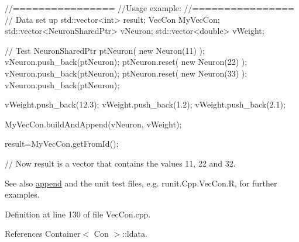 \begin{DoxyCode}
        //================
        //Usage example:
        //================
        // Data set up
                std::vector<int> result;
                VecCon MyVecCon;
                std::vector<NeuronSharedPtr> vNeuron;
                std::vector<double> vWeight;


        // Test
                NeuronSharedPtr ptNeuron( new Neuron(11) );
                vNeuron.push_back(ptNeuron);
                ptNeuron.reset( new Neuron(22) );
                vNeuron.push_back(ptNeuron);
                ptNeuron.reset( new Neuron(33) );
                vNeuron.push_back(ptNeuron);

                vWeight.push_back(12.3);
                vWeight.push_back(1.2);
                vWeight.push_back(2.1);

                MyVecCon.buildAndAppend(vNeuron, vWeight);

                result=MyVecCon.getFromId();

        // Now result is a vector that contains the values 11, 22 and 32.
\end{DoxyCode}


\begin{DoxySeeAlso}{See also}
\hyperlink{classvec_a_m_o_r_e_ab060ffa67e85997fc4236bedfd2f17b6}{append} and the unit test files, e.g. runit.Cpp.VecCon.R, for further examples. 
\end{DoxySeeAlso}


Definition at line 130 of file VecCon.cpp.



References Container$<$ Con $>$::ldata.


